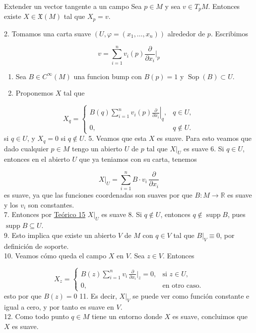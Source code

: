 \begin{bookexample}{Extender un vector tangente a un campo}
Sea $p \in M$ y sea $v \in T_pM$. Entonces existe $X \in \mathfrak X(M)$ tal que $X_p=v$.

\end{bookexample}
\begin{bookproof}{}
2. Tomamos una carta suave $(U,\varphi=(x_1,\ldots,x_n))$ alrededor de $p$. Escribimos

\[
v=\sum_{i=1}^n v_i(p)\frac{\partial}{\partial x_i}|_p
\]
\begin{enumerate}[start=3]
\item Sea $B \in C^\infty(M)$ una funcion bump con $B(p)=1$ y $\operatorname{Sop}(B) \subset U$.
\item Proponemos $X$ tal que
\end{enumerate}
\[
X_q=\begin{cases} B(q)\displaystyle\sum_{i=1}^n v_i(p)\left.\frac{\partial}{\partial x_i}\right|_q, & q\in U,\\ 0, & q\notin U.\end{cases}
\]
si $q \in U$, y $X_q=0$ si $q \notin U$. 
 5. Veamos que esta $X$ es suave. Para esto veamos que dado cualquier $p\in M$ tengo un abierto $U$ de $p$ tal que $X|_{U}$ es suave 6. Si $q\in U$, entonces en el abierto $U$ que ya teniamos con su carta, tenemos

\[
X|_{U}=\sum_{i=1}^{n} B\cdot v_i\,\frac{\partial}{\partial x_i}
\]
es suave, ya que las funciones coordenadas son suaves por que $B:M\to\mathbb R$ es suave y los $v_i$ son constantes.\\
7. Entonces por \hyperref[blk:f23a3b]{Teórico 15} $X|_{U}$ es suave 8. Si $q\notin U$, entonces $q\notin \operatorname{supp}B$, pues $\operatorname{supp}B\subseteq U$.\\
9. Esto implica que existe un abierto $V$ de $M$ con $q\in V$ tal que $B|_V\equiv 0$, por definición de soporte.\\
10. Veamos cómo queda el campo $X$ en $V$. Sea $z\in V$. Entonces

\[
X_z=\begin{cases} B(z)\sum_{i=1}^{n} v_i\,\frac{\partial}{\partial x_i}\big|_z=0, & \text{si } z\in U,\\ 0, & \text{en otro caso.}\end{cases}
\]
esto por que $B(z)=0$ 11. Es decir, $X|_V$ se puede ver como función constante e igual a cero, y por tanto es suave en $V$.\\
12. Como todo punto $q\in M$ tiene un entorno donde $X$ es suave, concluimos que $X$ es suave.

\bookqed
\end{bookproof}
